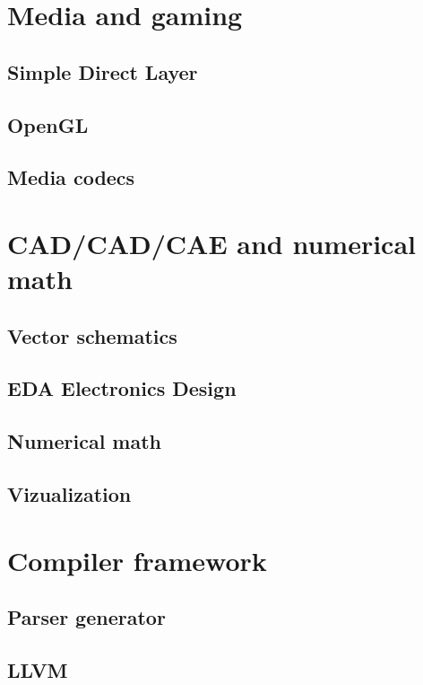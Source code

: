 \section{Media and gaming}
\subsection{Simple Direct Layer}
\subsection{OpenGL}
\subsection{Media codecs}

\section{CAD/CAD/CAE and numerical math}
\subsection{Vector schematics}
\subsection{EDA Electronics Design}
\subsection{Numerical math}
\subsection{Vizualization}

\section{Compiler framework}
\subsection{Parser generator}
\subsection{LLVM}
